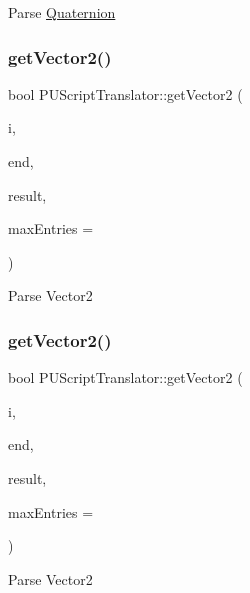 Parse \hyperlink{classQuaternion}{Quaternion} \mbox{\label{classPUScriptTranslator_ab1b2552dcb55bfde190225ce5f9dabdc}} 
\subsubsection{\texorpdfstring{get\+Vector2()}{getVector2()}\hspace{0.1cm}{\footnotesize\ttfamily [1/2]}}
{\footnotesize\ttfamily bool P\+U\+Script\+Translator\+::get\+Vector2 (\begin{DoxyParamCaption}\item[{P\+U\+Abstract\+Node\+List\+::const\+\_\+iterator}]{i,  }\item[{P\+U\+Abstract\+Node\+List\+::const\+\_\+iterator}]{end,  }\item[{\hyperlink{classVec2}{Vec2} $\ast$}]{result,  }\item[{int}]{max\+Entries = {} }\end{DoxyParamCaption})}

Parse Vector2 \mbox{\label{classPUScriptTranslator_ab1b2552dcb55bfde190225ce5f9dabdc}} 
\subsubsection{\texorpdfstring{get\+Vector2()}{getVector2()}\hspace{0.1cm}{\footnotesize\ttfamily [2/2]}}
{\footnotesize\ttfamily bool P\+U\+Script\+Translator\+::get\+Vector2 (\begin{DoxyParamCaption}\item[{P\+U\+Abstract\+Node\+List\+::const\+\_\+iterator}]{i,  }\item[{P\+U\+Abstract\+Node\+List\+::const\+\_\+iterator}]{end,  }\item[{\hyperlink{classVec2}{Vec2} $\ast$}]{result,  }\item[{int}]{max\+Entries = {} }\end{DoxyParamCaption})}

Parse Vector2 \mbox{\label{classPUScriptTranslator_a3362c25448c91a55aca1114c69ddbc97}} 
